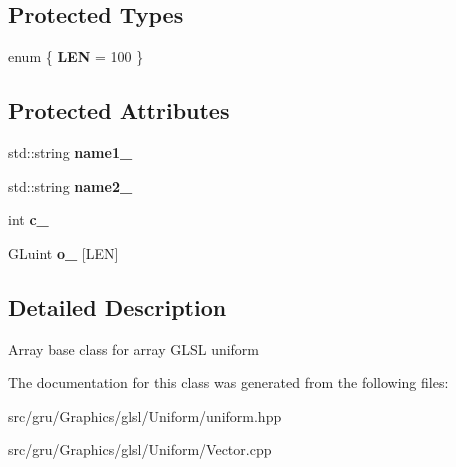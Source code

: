 \subsection*{\-Protected \-Types}
\begin{DoxyCompactItemize}
\item 
enum \{ {\bfseries \-L\-E\-N} =  100
 \}
\end{DoxyCompactItemize}
\subsection*{\-Protected \-Attributes}
\begin{DoxyCompactItemize}
\item 
\hypertarget{classglutpp_1_1glsl_1_1Uniform_1_1Vector_1_1Base_a25bc74a90af2fbc47dfc58e8776fecd6}{std\-::string {\bfseries name1\-\_\-}}\label{classglutpp_1_1glsl_1_1Uniform_1_1Vector_1_1Base_a25bc74a90af2fbc47dfc58e8776fecd6}

\item 
\hypertarget{classglutpp_1_1glsl_1_1Uniform_1_1Vector_1_1Base_a7947153fe1281a684aa8919d24cd2cc2}{std\-::string {\bfseries name2\-\_\-}}\label{classglutpp_1_1glsl_1_1Uniform_1_1Vector_1_1Base_a7947153fe1281a684aa8919d24cd2cc2}

\item 
\hypertarget{classglutpp_1_1glsl_1_1Uniform_1_1Vector_1_1Base_a16177fcc79cf039fee87f64761edf9c7}{int {\bfseries c\-\_\-}}\label{classglutpp_1_1glsl_1_1Uniform_1_1Vector_1_1Base_a16177fcc79cf039fee87f64761edf9c7}

\item 
\hypertarget{classglutpp_1_1glsl_1_1Uniform_1_1Vector_1_1Base_a44dd7d8da8ecd2b894c3e14ba3234750}{\-G\-Luint {\bfseries o\-\_\-} \mbox{[}\-L\-E\-N\mbox{]}}\label{classglutpp_1_1glsl_1_1Uniform_1_1Vector_1_1Base_a44dd7d8da8ecd2b894c3e14ba3234750}

\end{DoxyCompactItemize}


\subsection{\-Detailed \-Description}
\-Array base class for array \-G\-L\-S\-L uniform 

\-The documentation for this class was generated from the following files\-:\begin{DoxyCompactItemize}
\item 
src/gru/\-Graphics/glsl/\-Uniform/uniform.\-hpp\item 
src/gru/\-Graphics/glsl/\-Uniform/\-Vector.\-cpp\end{DoxyCompactItemize}

